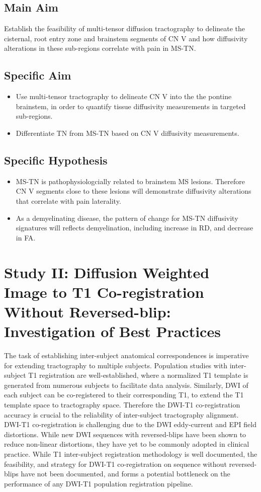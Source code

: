 \subsection{Main Aim} 
Establish the feasibility of multi-tensor diffusion tractography to delineate the cisternal, root entry zone and brainstem segments of CN V and how diffusivity alterations in these sub-regions correlate with pain in MS-TN.

\subsection{Specific Aim}
\begin{itemize}
    \item Use multi-tensor tractography to delineate CN V into the the pontine brainstem, in order to quantify tissue diffusivity measurements in targeted sub-regions.
    \item Differentiate TN from MS-TN based on CN V diffusivity measurements.
\end{itemize}

\subsection{Specific Hypothesis}
\begin{itemize}
    \item MS-TN is pathophysiologcially related to brainstem MS lesions. Therefore CN V segments close to these lesions will demonstrate diffusivity alterations that correlate with pain laterality.
    \item As a demyelinating disease, the pattern of change for MS-TN diffusivity signatures will reflects demyelination, including increase in RD, and decrease in FA. 
\end{itemize}

\section{Study II: Diffusion Weighted Image to T1 Co-registration Without Reversed-blip: Investigation of Best Practices}
The task of establishing inter-subject anatomical correspondences is imperative for extending tractography to multiple subjects. Population studies with inter-subject T1 registration are well-established, where a normalized T1 template is generated from numerous subjects to facilitate data analysis. Similarly, DWI of each subject can be co-registered to their corresponding T1, to extend the T1 template space to tractography space. Therefore the DWI-T1 co-registration accuracy is crucial to the reliability of inter-subject tractography alignment. DWI-T1 co-registration is challenging due to the DWI eddy-current and EPI field distortions. While new DWI sequences with reversed-blips have been shown to reduce non-linear distortions, they have yet to be commonly adopted in clinical practice. While T1 inter-subject registration methodology is well documented, the feasibility, and strategy for DWI-T1 co-registration on sequence without reversed-blips have not been documented, and forms a potential bottleneck on the performance of any DWI-T1 population registration pipeline.

